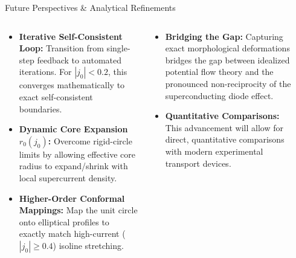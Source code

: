 \documentclass[aspectratio=169, 10pt]{beamer}
\begin{document}
\begin{frame}{Future Perspectives \& Analytical Refinements}
  \begin{columns}[c]
      \begin{infobox}
        \begin{itemize}
          \item \textbf{Iterative Self-Consistent Loop:} Transition from single-step feedback to automated iterations. For $|j_0|<0.2$, this converges mathematically to exact self-consistent boundaries.
          \item \textbf{Dynamic Core Expansion $r_0(j_0)$:} Overcome rigid-circle limits by allowing effective core radius to expand/shrink with local supercurrent density.
          \item \textbf{Higher-Order Conformal Mappings:} Map the unit circle onto elliptical profiles to exactly match high-current ($|j_0|\ge 0.4$) isoline stretching.
        \end{itemize}
      \end{infobox}
      \begin{keybox}
        \begin{itemize}
          \item \textbf{Bridging the Gap:} Capturing exact morphological deformations bridges the gap between idealized potential flow theory and the pronounced non-reciprocity of the superconducting diode effect.
          \item \textbf{Quantitative Comparisons:} This advancement will allow for direct, quantitative comparisons with modern experimental transport devices.
        \end{itemize}
      \end{keybox}
      \vspace{2pt}
      \begin{center}
      \end{center}
  \end{columns}
\end{frame}
\end{document}
